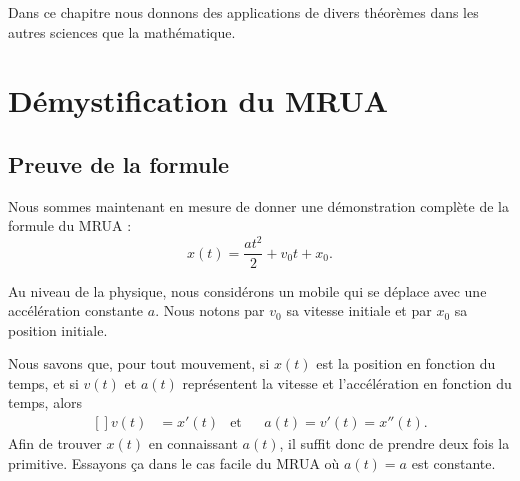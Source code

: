 
Dans ce chapitre nous donnons des applications de divers théorèmes dans les autres sciences que la mathématique.

\section{Démystification du MRUA}
\label{SecMRUAsecondeGGdQoT}

                    \subsection{Preuve de la formule}

Nous sommes maintenant en mesure de donner une démonstration complète de la formule du MRUA :
\begin{equation}    \label{EqMRUAINT}
    x(t) = \frac{ at^2 }{ 2 } + v_0t +x_0.
\end{equation}

Au niveau de la physique, nous considérons un mobile qui se déplace avec une accélération constante $a$. Nous notons par $v_0$ sa vitesse initiale et par $x_0$ sa position initiale.

Nous savons que, pour tout mouvement, si $x(t)$ est la position en fonction du temps, et si $v(t)$ et $a(t)$ représentent la vitesse et l'accélération en fonction du temps, alors
\begin{equation}
    \begin{aligned}[]
        v(t)&=x'(t)&\text{et}   &&a(t)=v'(t)=x''(t).
    \end{aligned}
\end{equation}
Afin de trouver $x(t)$ en connaissant $a(t)$, il \og suffit\fg{} donc de prendre deux fois la primitive. Essayons ça dans le cas facile du MRUA où $a(t)=a$ est constante.

